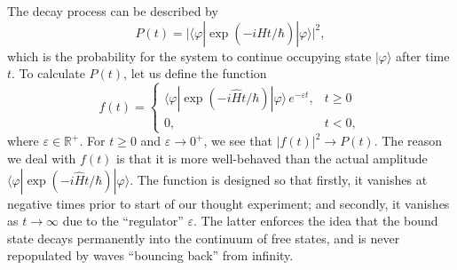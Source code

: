 \documentclass[pra,12pt]{revtex4}
\begin{document}
The decay process can be described by
\begin{equation}
  P(t) = \Big|\langle\varphi|\exp\left(-i\hat{H}t/\hbar\right)|\varphi\rangle\Big|^2,
\end{equation}
which is the probability for the system to continue occupying state
$|\varphi\rangle$ after time $t$.  To calculate $P(t)$, let us define
the function
\begin{equation}
  f(t) = \begin{cases} \langle\varphi|\exp\left(-i\hat{H}t/\hbar\right)|\varphi\rangle \,e^{-\varepsilon t}, & t \ge 0 \\ 0, & t < 0,\end{cases}
\end{equation}
where $\varepsilon \in \mathbb{R}^+$.  For $t \ge 0$ and $\varepsilon
\rightarrow 0^+$, we see that $|f(t)|^2 \rightarrow P(t)$.  The reason
we deal with $f(t)$ is that it is more well-behaved than the actual
amplitude $\langle\varphi|\exp(-i\hat{H}t/\hbar)|\varphi\rangle$.  The
function is designed so that firstly, it vanishes at negative times
prior to start of our thought experiment; and secondly, it vanishes as
$t\rightarrow\infty$ due to the ``regulator'' $\varepsilon$.  The
latter enforces the idea that the bound state decays permanently into
the continuum of free states, and is never repopulated by waves
``bouncing back'' from infinity.
\end{document}
